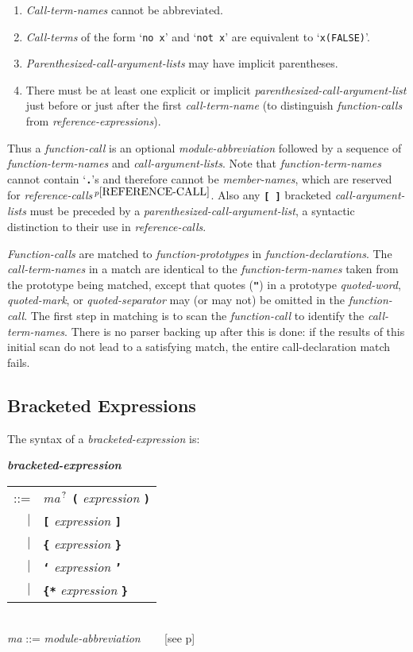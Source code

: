 \documentclass[12pt]{article}
\newcommand{\TT}[1]{{\tt \bfseries #1}}
\newcommand{\QMARK}{{$^{\,\mbox{\footnotesize ?}}$}}
\newcommand{\emkey}[1]{{\em \bfseries #1}}
\newcommand{\pagref}[1]{p\pageref{#1}}
\newcommand{\pagnote}[1]{$\,^{p\pageref{#1}}$}
\newenvironment{indpar}[1][0.3in]%
	{\begin{list}{}%
		     {\setlength{\itemsep}{0in}%
		      \setlength{\topsep}{0in}%
		      \setlength{\parsep}{1ex}%
		      \setlength{\labelwidth}{#1}%
		      \setlength{\leftmargin}{#1}%
		      \addtolength{\leftmargin}{\labelsep}}%
	 \item}%
	{\end{list}}
\begin{document}
\begin{indpar}
\begin{enumerate}
\item {\em Call-term-names} cannot be abbreviated.
\item {\em Call-terms} of the form `{\tt no x}' and `{\tt not x}' are
equivalent to `{\tt x(FALSE)}'.
\item {\em Parenthesized-call-argument-lists} may have implicit
parentheses.
\item\label{PARENTHESIZED-ARGUMENT-LIST-RULE}
There must be at least one explicit or implicit
{\em parenthesized-call-argument-list} just before or just
after the first {\em call-term-name} (to distinguish {\em function-calls}
from {\em reference-expressions}).
\end{enumerate}
\end{indpar}

Thus a {\em function-call} is an optional {\em module-abbreviation}
followed by a sequence of {\em function-term-names}
and {\em call-argument-lists}.  Note that {\em function-term-names} cannot
contain `\TT{.}'s and therefore cannot be {\em member-names},
which are reserved for {\em reference-calls}\pagnote{REFERENCE-CALL}.
Also any \TT{[~]} bracketed {\em call-argument-lists} must be preceded by
a {\em parenthesized-call-argument-list},
a syntactic distinction to their use in {\em reference-calls}.

{\em Function-calls} are matched to {\em function-prototypes} in
{\em function-declarations}.  The
{\em call-term-names} in a match are identical to the
{\em function-term-names} taken from the prototype being matched, except
that quotes (\TT{"}) in a prototype {\em quoted-word}, {\em quoted-mark}, or
{\em quoted-separator} may (or may not) be omitted in the
{\em function-call}.  The first
step in matching is to scan the {\em function-call} to identify the
{\em call-term-names}.  There is no parser backing up after this is
done: if the results of this initial scan do not lead to a satisfying
match, the entire call-declaration match fails.

\subsection{Bracketed Expressions}
\label{BRACKETED-EXPRESSIONS}

The syntax of a {\em bracketed-expression} is:

\begin{indpar}
\emkey{bracketed-expression}\label{BRACKETED-EXPRESSION}
    \begin{tabular}[t]{@{}rl}
    ::= & {\em ma}\QMARK{} \TT{(} {\em expression} \TT{)} \\
    $|$ & \TT{[} {\em expression} \TT{]} \\
    $|$ & \TT{\{} {\em expression} \TT{\}} \\
    $|$ & \TT{`} {\em expression} \TT{'} \\
    $|$ & \TT{\{*} {\em expression} \TT{*\}} \\
    \end{tabular}
\\[0.5ex]
{\em ma} ::= {\em module-abbreviation} ~~~ [see \pagref{MODULE-ABBREVIATION}]
\end{indpar}
\end{document}
